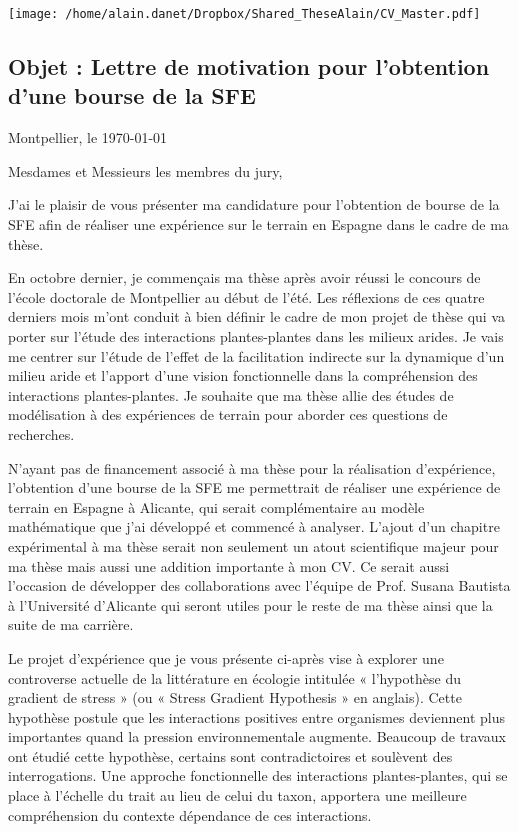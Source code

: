 \documentclass[12pt]{article} %
\begin{document}


\begin{center}
\texttt{[image: /home/alain.danet/Dropbox/Shared\_TheseAlain/CV\_Master.pdf]}
\end{center}

\subsection{Objet : Lettre de motivation pour l’obtention d’une bourse de la SFE}

\begin{flushright}
Montpellier, le \today
\end{flushright}
Mesdames et Messieurs les membres du jury,

J’ai le plaisir de vous présenter ma candidature pour l’obtention de bourse de la SFE afin de réaliser une expérience sur le terrain en Espagne dans le cadre de ma thèse. 

En octobre dernier, je commençais ma thèse après avoir réussi le concours de l’école doctorale de Montpellier au début de l'été. Les réflexions de ces quatre derniers mois m’ont conduit à bien définir le cadre de mon projet de thèse qui va porter sur l'étude des interactions plantes-plantes dans les milieux arides. Je vais me centrer sur l'étude de l'effet de la facilitation indirecte sur la dynamique d'un milieu aride et l'apport d'une vision fonctionnelle dans la compréhension des interactions plantes-plantes. Je souhaite que ma thèse allie des études de modélisation à des expériences de terrain pour aborder ces questions de recherches.

N’ayant pas de financement associé à ma thèse pour la réalisation d’expérience, l’obtention d’une bourse de la SFE me permettrait de réaliser une expérience de terrain en Espagne à Alicante, qui serait complémentaire au modèle mathématique que j’ai développé et commencé à analyser. L’ajout d’un chapitre expérimental à ma thèse serait non seulement un atout scientifique majeur pour ma thèse mais aussi une addition importante à mon CV. Ce serait aussi l’occasion de développer des collaborations avec l’équipe de Prof. Susana Bautista à l’Université d’Alicante qui seront utiles pour le reste de ma thèse ainsi que la suite de ma carrière.

Le projet d’expérience que je vous présente ci-après vise à explorer une controverse actuelle de la littérature en écologie intitulée « l’hypothèse du gradient de stress » (ou « Stress Gradient Hypothesis » en anglais). Cette hypothèse postule que les interactions positives entre organismes deviennent plus importantes quand la pression environnementale augmente. Beaucoup de travaux ont étudié cette hypothèse, certains sont contradictoires et soulèvent des interrogations. Une approche fonctionnelle des interactions plantes-plantes, qui se place à l'échelle du trait au lieu de celui du taxon, apportera une meilleure compréhension du contexte dépendance de ces interactions.
\end{document}
